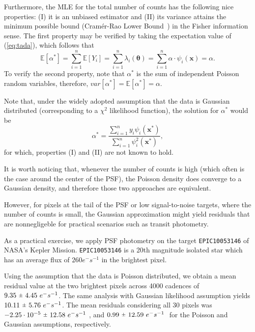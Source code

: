 \documentclass{rnaastex}
\newcommand{\rpm}{\sbox0{$1$}\sbox2{$\scriptstyle\pm$}
\raise\dimexpr(\ht0-\ht2)/2\relax\box2 }
\begin{document}
Furthermore, the MLE for the total number of counts has the following nice properties: (\textrm{I}) it is an unbiased estimator and (\textrm{II}) its variance attains the minimum possible bound (Cram\'er-Rao Lower Bound~\citep{bobrovsky:1987}) in the Fisher information sense. The first property may be verified by taking the expectation value of (\ref{eq:tada}), which follows that
\begin{equation}
    \mathbb{E}\left[\alpha^{*}\right] = \sum_{i=1}^{n}\mathbb{E}[Y_i] = \sum_{i=1}^{n} \lambda_i(\bm{\theta}) = \sum_{i=1}^{n} \alpha\cdot\psi_i(\bm{x}) = \alpha.
\end{equation}
To verify the second property, note that $\alpha^{*}$ is the sum of independent Poisson random variables, therefore, $var\left[\alpha^{*}\right] = \mathbb{E}\left[\alpha^{*}\right] = \alpha$.

Note that, under the widely adopted assumption that the data is Gaussian distributed (corresponding to a $\chi^2$ likelihood function), the solution for $\alpha^{*}$ would be
\begin{equation}
    \alpha^{*} = \dfrac{\sum_{i=1}^{n}y_i \psi_i(\bm{x}^{*})}{\sum_{i=1}^{n}\psi^2_i(\bm{x}^{*})},
\end{equation}
for which, properties (I) and (II) are not known to hold.

It is worth noticing that, whenever the number of counts is high (which often is the case around the center of the PSF), the Poisson density does converge to a Gaussian density, and therefore those two approaches are equivalent.

However, for pixels at the tail of the PSF or low signal-to-noise targets, where the number of counts is small, the Gaussian approximation might yield residuals that are nonnegligeble for practical scenarios such as transit photometry.

As a practical exercise, we apply PSF photometry on the target \texttt{EPIC10053146} of NASA's Kepler Mission. \texttt{EPIC10053146} is a 20th magnitude isolated star which has an average flux of $260 e^{-}s^{-1}$ in the brightest pixel.

Using the assumption that the data is Poisson distributed, we obtain a mean residual value at
the two brightest pixels across 4000 cadences of $9.35~\rpm~4.45~e^{-}s^{-1}$. The same analysis
with Gaussian likelihood assumption yields $10.11~\rpm~5.76~e^{-}s^{-1}$. The mean residuals
considering all 30 pixels was $-2.25\cdot 10^{-5}~\rpm~12.58~e^{-}s^{-1}~$, and $0.99~\rpm~12.59~e^{-}s^{-1}~$
for the Poisson and Gaussian assumptions, respectively.
\end{document}
